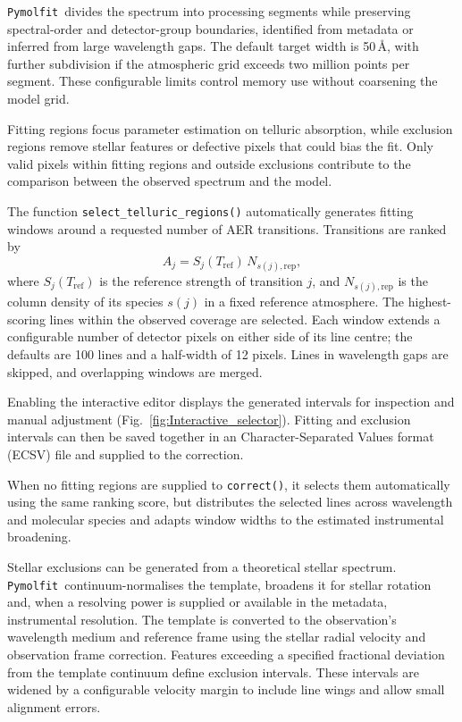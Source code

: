 \documentclass{aa}
\newcommand{\Pymolfit}{\texttt{Pymolfit}}
\begin{document}
\Pymolfit\ divides the spectrum into processing segments while preserving spectral-order and detector-group boundaries, identified from metadata or inferred from large wavelength gaps. The default target width is 50\,\AA, with further subdivision if the atmospheric grid exceeds two million points per segment. These configurable limits control memory use without coarsening the model grid.

Fitting regions focus parameter estimation on telluric absorption, while exclusion regions remove stellar features or defective pixels that could bias the fit. Only valid pixels within fitting regions and outside exclusions contribute to the comparison between the observed spectrum and the model.

The function \texttt{select\_telluric\_regions()} automatically generates fitting windows around a requested number of AER transitions. Transitions are ranked by
\begin{equation}
    A_j = S_j(T_{\mathrm{ref}})\,N_{s(j),\mathrm{rep}},
\end{equation}
where \(S_j(T_{\mathrm{ref}})\) is the reference strength of transition \(j\), and \(N_{s(j),\mathrm{rep}}\) is the column density of its species \(s(j)\) in a fixed reference atmosphere. The highest-scoring lines within the observed coverage are selected. Each window extends a configurable number of detector pixels on either side of its line centre; the defaults are 100 lines and a half-width of 12 pixels. Lines in wavelength gaps are skipped, and overlapping windows are merged.

Enabling the interactive editor displays the generated intervals for inspection and manual adjustment (Fig.~\ref{fig:Interactive_selector}). Fitting and exclusion intervals can then be saved together in an Character-Separated Values format (ECSV) file and supplied to the correction.

When no fitting regions are supplied to \texttt{correct()}, it selects them automatically using the same ranking score, but distributes the selected lines across wavelength and molecular species and adapts window widths to the estimated instrumental broadening.

Stellar exclusions can be generated from a theoretical stellar spectrum. \Pymolfit\ continuum-normalises the template, broadens it for stellar rotation and, when a resolving power is supplied or available in the metadata, instrumental resolution. The template is converted to the observation's wavelength medium and reference frame using the stellar radial velocity and observation frame correction. Features exceeding a specified fractional deviation from the template continuum define exclusion intervals. These intervals are widened by a configurable velocity margin to include line wings and allow small alignment errors.
\end{document}
